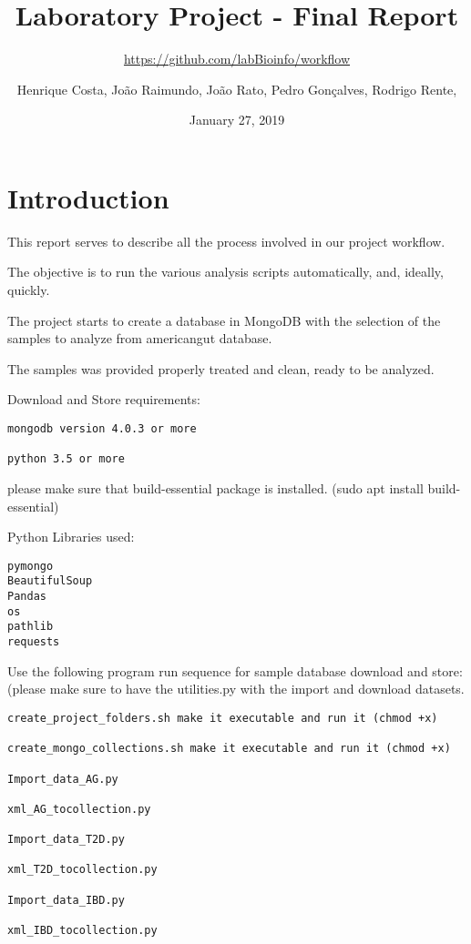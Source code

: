 \documentclass[]{article}
\title{Laboratory Project - Final Report}
\subtitle{\url{https://github.com/labBioinfo/workflow}}
\author{Henrique Costa, João Raimundo, João Rato, Pedro Gonçalves, Rodrigo
Rente,}
\date{January 27, 2019}
\begin{document}
\maketitle

\hypertarget{introduction}{%
\section{Introduction}\label{introduction}}

This report serves to describe all the process involved in our project
workflow.

The objective is to run the various analysis scripts automatically, and,
ideally, quickly.

The project starts to create a database in MongoDB with the selection of
the samples to analyze from americangut database.

The samples was provided properly treated and clean, ready to be
analyzed.

Download and Store requirements:

\begin{verbatim}
mongodb version 4.0.3 or more

python 3.5 or more
\end{verbatim}

please make sure that build-essential package is installed. (sudo apt
install build-essential)

Python Libraries used:

\begin{verbatim}
pymongo
BeautifulSoup
Pandas
os
pathlib
requests
\end{verbatim}

Use the following program run sequence for sample database download and
store: (please make sure to have the utilities.py with the import and
download datasets.

\begin{verbatim}
create_project_folders.sh make it executable and run it (chmod +x)

create_mongo_collections.sh make it executable and run it (chmod +x)

Import_data_AG.py

xml_AG_tocollection.py

Import_data_T2D.py

xml_T2D_tocollection.py

Import_data_IBD.py

xml_IBD_tocollection.py
\end{verbatim}
\end{document}

